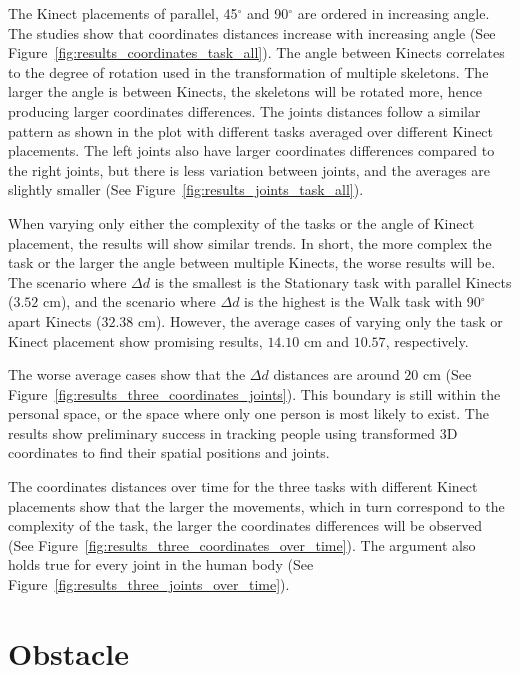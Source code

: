 The Kinect placements of parallel, 45$^{\circ}$ and 90$^{\circ}$ are ordered in increasing angle. The studies show that coordinates distances increase with increasing angle (See Figure~\ref{fig:results_coordinates_task_all}). The angle between Kinects correlates to the degree of rotation used in the transformation of multiple skeletons. The larger the angle is between Kinects, the skeletons will be rotated more, hence producing larger coordinates differences. The joints distances follow a similar pattern as shown in the plot with different tasks averaged over different Kinect placements. The left joints also have larger coordinates differences compared to the right joints, but there is less variation between joints, and the averages are slightly smaller (See Figure~\ref{fig:results_joints_task_all}).

When varying only either the complexity of the tasks or the angle of Kinect placement, the results will show similar trends. In short, the more complex the task or the larger the angle between multiple Kinects, the worse results will be. The scenario where $\Delta d$ is the smallest is the Stationary task with parallel Kinects ($3.52$ cm), and the scenario where $\Delta d$ is the highest is the Walk task with 90$^{\circ}$ apart Kinects ($32.38$ cm). However, the average cases of varying only the task or Kinect placement show promising results, $14.10$ cm and $10.57$, respectively.

The worse average cases show that the $\Delta d$ distances are around $20$ cm (See Figure~\ref{fig:results_three_coordinates_joints}). This boundary is still within the personal space, or the space where only one person is most likely to exist. The results show preliminary success in tracking people using transformed 3D coordinates to find their spatial positions and joints.

The coordinates distances over time for the three tasks with different Kinect placements show that the larger the movements, which in turn correspond to the complexity of the task, the larger the coordinates differences will be observed (See Figure~\ref{fig:results_three_coordinates_over_time}). The argument also holds true for every joint in the human body (See Figure~\ref{fig:results_three_joints_over_time}).

\section{Obstacle}
\label{sec:discussion_obstacle}

